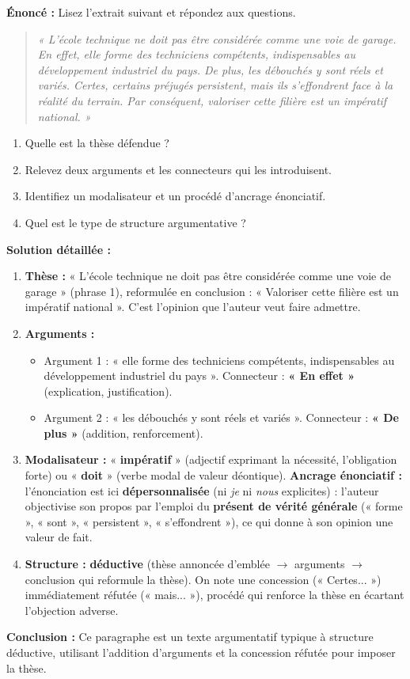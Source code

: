 \documentclass[11pt]{article}
\begin{document}
\begin{exoresolu}
\textbf{Énoncé :} Lisez l'extrait suivant et répondez aux questions.
\begin{quote}
\emph{« L'école technique ne doit pas être considérée comme une voie de garage. En effet, elle forme des techniciens compétents, indispensables au développement industriel du pays. De plus, les débouchés y sont réels et variés. Certes, certains préjugés persistent, mais ils s'effondrent face à la réalité du terrain. Par conséquent, valoriser cette filière est un impératif national. »}
\end{quote}
\begin{enumerate}
    \item Quelle est la thèse défendue ?
    \item Relevez deux arguments et les connecteurs qui les introduisent.
    \item Identifiez un modalisateur et un procédé d'ancrage énonciatif.
    \item Quel est le type de structure argumentative ?
\end{enumerate}
\tcblower
\textbf{Solution détaillée :}
\begin{enumerate}
    \item \textbf{Thèse :} « L'école technique ne doit pas être considérée comme une voie de garage » (phrase 1), reformulée en conclusion : « Valoriser cette filière est un impératif national ». C'est l'opinion que l'auteur veut faire admettre.
    \item \textbf{Arguments :}
        \begin{itemize}
            \item Argument 1 : « elle forme des techniciens compétents, indispensables au développement industriel du pays ». Connecteur : \textbf{« En effet »} (explication, justification).
            \item Argument 2 : « les débouchés y sont réels et variés ». Connecteur : \textbf{« De plus »} (addition, renforcement).
        \end{itemize}
    \item \textbf{Modalisateur :} « \textbf{impératif} » (adjectif exprimant la nécessité, l'obligation forte) ou « \textbf{doit} » (verbe modal de valeur déontique). \textbf{Ancrage énonciatif :} l'énonciation est ici \textbf{dépersonnalisée} (ni \emph{je} ni \emph{nous} explicites) : l'auteur objectivise son propos par l'emploi du \textbf{présent de vérité générale} (« forme », « sont », « persistent », « s'effondrent »), ce qui donne à son opinion une valeur de fait.
    \item \textbf{Structure :} \textbf{déductive} (thèse annoncée d'emblée $\to$ arguments $\to$ conclusion qui reformule la thèse). On note une concession (« Certes... ») immédiatement réfutée (« mais... »), procédé qui renforce la thèse en écartant l'objection adverse.
\end{enumerate}
\textbf{Conclusion :} Ce paragraphe est un texte argumentatif typique à structure déductive, utilisant l'addition d'arguments et la concession réfutée pour imposer la thèse.
\end{exoresolu}
\end{document}
